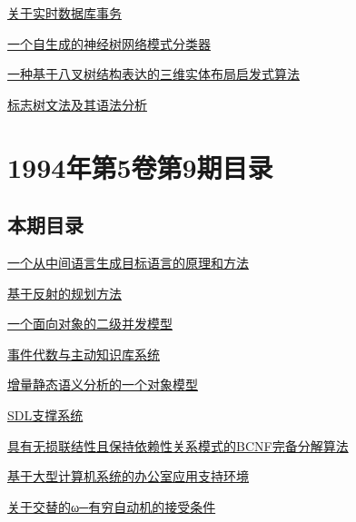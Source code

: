\documentclass[a4paper]{article}
\begin{document}
\href{http://www.jos.org.cn/ch/reader/download_pdf.aspx?file_no=19951006&year_id=1995&quarter_id=10&falg=1}{关于实时数据库事务}

\href{http://www.jos.org.cn/ch/reader/download_pdf.aspx?file_no=19951007&year_id=1995&quarter_id=10&falg=1}{一个自生成的神经树网络模式分类器}

\href{http://www.jos.org.cn/ch/reader/download_pdf.aspx?file_no=19951008&year_id=1995&quarter_id=10&falg=1}{一种基于八叉树结构表达的三维实体布局启发式算法}

\href{http://www.jos.org.cn/ch/reader/download_pdf.aspx?file_no=19951009&year_id=1995&quarter_id=10&falg=1}{标志树文法及其语法分析}


\section{\textbf{1994年第5卷第9期目录}}
\subsection{本期目录}
\href{http://www.jos.org.cn/ch/reader/download_pdf.aspx?file_no=19940901&year_id=1994&quarter_id=9&falg=1}{一个从中间语言生成目标语言的原理和方法}

\href{http://www.jos.org.cn/ch/reader/download_pdf.aspx?file_no=19940902&year_id=1994&quarter_id=9&falg=1}{基于反射的规划方法}

\href{http://www.jos.org.cn/ch/reader/download_pdf.aspx?file_no=19940903&year_id=1994&quarter_id=9&falg=1}{一个面向对象的二级并发模型}

\href{http://www.jos.org.cn/ch/reader/download_pdf.aspx?file_no=19940904&year_id=1994&quarter_id=9&falg=1}{事件代数与主动知识库系统}

\href{http://www.jos.org.cn/ch/reader/download_pdf.aspx?file_no=19940905&year_id=1994&quarter_id=9&falg=1}{增量静态语义分析的一个对象模型}

\href{http://www.jos.org.cn/ch/reader/download_pdf.aspx?file_no=19940906&year_id=1994&quarter_id=9&falg=1}{SDL支撑系统}

\href{http://www.jos.org.cn/ch/reader/download_pdf.aspx?file_no=19940907&year_id=1994&quarter_id=9&falg=1}{具有无损联结性且保持依赖性关系模式的BCNF完备分解算法}

\href{http://www.jos.org.cn/ch/reader/download_pdf.aspx?file_no=19940908&year_id=1994&quarter_id=9&falg=1}{基于大型计算机系统的办公室应用支持环境}

\href{http://www.jos.org.cn/ch/reader/download_pdf.aspx?file_no=19940909&year_id=1994&quarter_id=9&falg=1}{关于交替的ω─有穷自动机的接受条件}
\end{document}
